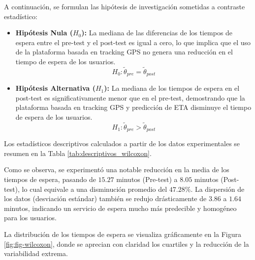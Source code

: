 A continuación, se formulan las hipótesis de investigación sometidas a contraste estadístico:
\begin{itemize}
    \item \textbf{Hipótesis Nula ($H_0$):} La mediana de las diferencias de los tiempos de espera entre el pre-test y el post-test es igual a cero, lo que implica que el uso de la plataforma basada en tracking GPS no genera una reducción en el tiempo de espera de los usuarios.
    $$H_0: \tilde{\theta}_{pre} = \tilde{\theta}_{post}$$
    \item \textbf{Hipótesis Alternativa ($H_1$):} La mediana de los tiempos de espera en el post-test es significativamente menor que en el pre-test, demostrando que la plataforma basada en tracking GPS y predicción de ETA disminuye el tiempo de espera de los usuarios.
    $$H_1: \tilde{\theta}_{pre} > \tilde{\theta}_{post}$$
\end{itemize}

Los estadísticos descriptivos calculados a partir de los datos experimentales se resumen en la Tabla \ref{tab:descriptivos_wilcoxon}.

\begin{table}[H]
\centering
\caption{Estadísticos descriptivos y resultados de normalidad (N=20)}
\label{tab:descriptivos_wilcoxon}
\end{table}

Como se observa, se experimentó una notable reducción en la media de los tiempos de espera, pasando de $15.27$ minutos (Pre-test) a $8.05$ minutos (Post-test), lo cual equivale a una disminución promedio del $47.28\%$. La dispersión de los datos (desviación estándar) también se redujo drásticamente de $3.86$ a $1.64$ minutos, indicando un servicio de espera mucho más predecible y homogéneo para los usuarios.

La distribución de los tiempos de espera se visualiza gráficamente en la Figura \ref{fig:fig-wilcoxon}, donde se aprecian con claridad los cuartiles y la reducción de la variabilidad extrema.


